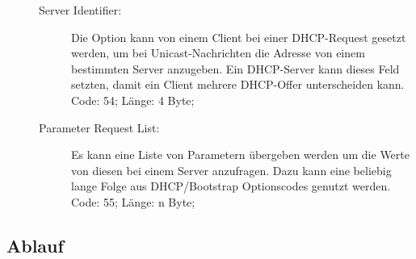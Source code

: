 \begin{description}
\begin{description}
\begin{itemize}
	\end{itemize}
	
	\item[Server Identifier:] Die Option kann von einem Client bei einer DHCP-Request gesetzt werden, um bei Unicast-Nachrichten die Adresse von einem bestimmten Server anzugeben. Ein DHCP-Server kann dieses Feld setzten, damit ein Client mehrere DHCP-Offer unterscheiden kann. \\
	Code: 54; Länge: 4 Byte;
	
	
	\item[Parameter Request List:] Es kann eine Liste von Parametern übergeben werden um die Werte von diesen bei einem Server anzufragen. Dazu kann eine beliebig lange Folge aus DHCP/Bootstrap Optionscodes genutzt werden.\\
	Code: 55; Länge: n Byte;	
\end{description}
\end{description}
\subsection{Ablauf}

